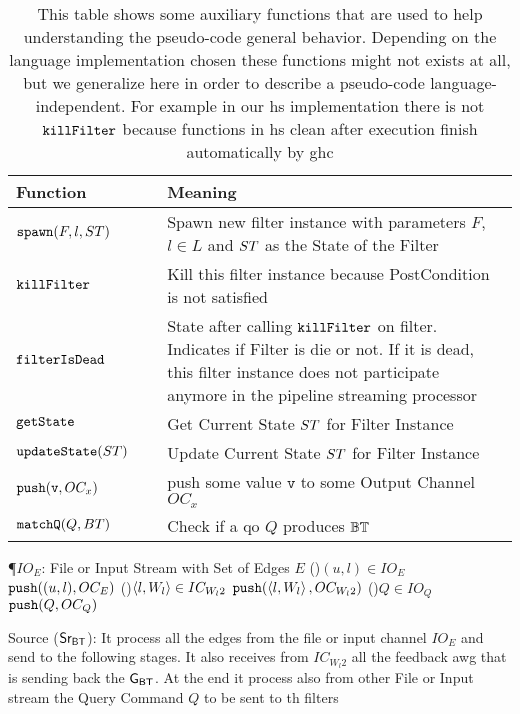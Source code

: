 \begin{table}[!htp]
\centering
\begin{tabular}{|p{0.3\linewidth}|p{0.7\linewidth}|} \hline
\textbf{Function} & \textbf{Meaning}\\ \hline
$\mathtt{spawn}(F,l,ST)$ & Spawn new filter instance with parameters $F$, $l \in L$ and $ST$ as the State of the Filter\\\hline
$\mathtt{killFilter}$ & Kill this filter instance because PostCondition is not satisfied\\ \hline
$\mathtt{filterIsDead}$ & State after calling $\mathtt{killFilter}$ on filter. Indicates if Filter is die or not. If it is dead, this filter instance does not participate anymore in the pipeline streaming processor\\ \hline
$\mathtt{getState}$ & Get Current State $ST$ for Filter Instance \\ \hline
$\mathtt{updateState}(ST)$ & Update Current State $ST$ for Filter Instance \\ \hline
$\mathtt{push}(\mathtt{v}, OC_x)$ & push some value $\mathtt{v}$ to some Output Channel $OC_x$ \\\hline
$\mathtt{matchQ}(Q, BT)$ & Check if a \acrshort{qo} $Q$ produces $\mathbb{BT}$ \\ \hline
\end{tabular}
\caption[{[\acrshort{iebt}] Summary of auxiliary functions for handling \acrshort{dpbt} internals}]{This table shows some auxiliary functions that are used to help understanding the pseudo-code general behavior. Depending on the language implementation chosen these functions might not exists at all, but we generalize here in order to describe a pseudo-code language-independent. For example in our \acrshort{hs} implementation there is not $\mathtt{killFilter}$ because functions in \acrshort{hs} clean after execution finish automatically by \acrshort{ghc}}
\label{table:aux:fn}
\end{table}
      
\begin{algorithm}[h!]
\SetAlgoRefName{[A1]}
\P{$IO_E$: File or Input Stream with Set of Edges $E$}
\ForAll(){$(u,l) \in IO_E$}
{$\mathtt{push}((u,l), OC_E)$ \label{algo:source:1}
}
\ForAll(){$\left\langle l, W_l \right\rangle \in IC_{W_l2}$}
{$\mathtt{push}(\left\langle l, W_l \right\rangle, OC_{W_l2})$ \label{algo:source:2}
}
\ForAll(){$Q \in IO_Q$}
{$\mathtt{push}(Q, OC_Q)$ \label{algo:source:3}
}
\caption[Source ($\ibt$)]{Source ($\ibt$): It process all the edges from the file or input channel $IO_E$ and send to the following stages. It also receives from $IC_{W_l2}$ all the feedback \acrshort{awg} that is sending back the $\mathsf{G_{BT}}$. At the end it process also from other File or Input stream the Query Command $Q$ to be sent to th filters}
\label{algo:source}
\end{algorithm}

